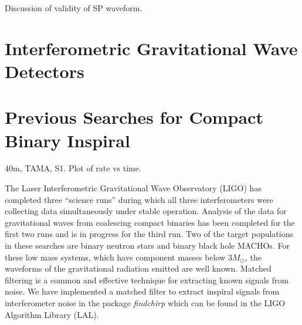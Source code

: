 Discussion of validity of SP waveform.


\section{Interferometric Gravitational Wave Detectors}
\label{s:ifo}

\section{Previous Searches for Compact Binary Inspiral}

40m, TAMA, S1. Plot of rate vs time.


The Laser Interferometric Gravitational Wave Observatory (LIGO)\cite{barish}
has completed three ``science runs'' during which all three interferometers
were collecting data simultaneously under stable operation. Analysis of the
data for gravitational waves from coalescing compact binaries has been
completed for the first two runs\cite{bns1,bns2,macho} and is in progress for
the third run. Two of the target populations in these searches are binary
neutron stars\cite{300yrs} and binary black hole
MACHOs\cite{sammacho,nakamura}. For these low mass systems, which have
component masses below $3 M_\odot$, the waveforms of the gravitational
radiation emitted are well known\cite{bdiww,biww}.  Matched filtering is a
common and effective technique for extracting known signals from
noise\cite{wz}. We have implemented a matched filter to extract inspiral
signals from interferometer noise in the package \emph{findchirp} which can be
found in the LIGO Algorithm Library (LAL)\cite{lal}.


